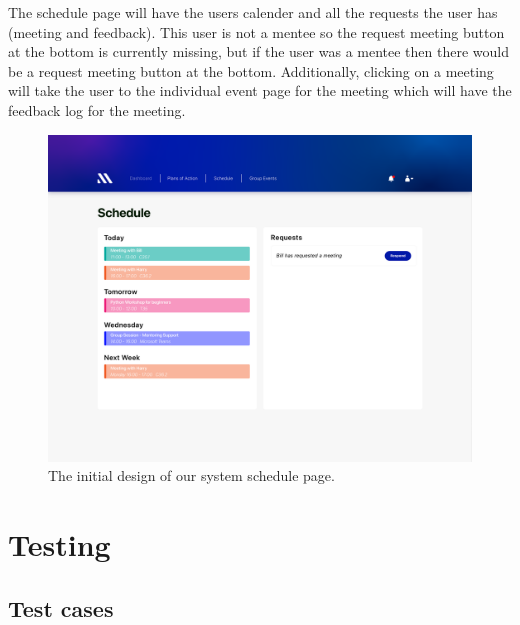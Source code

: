 \documentclass[10pt]{article}
\begin{document}
The schedule page will have the users calender and all the requests the user has
(meeting and feedback). This user is not a mentee so the request meeting button
at the bottom is currently missing, but if the user was a mentee then there
would be a request meeting button at the bottom. Additionally, clicking on a
meeting will take the user to the individual event page for the meeting which
will have the feedback log for the meeting.

\begin{figure}[H]
    \centering
    \includegraphics[width=0.48 \textwidth]{Schedule}
    \caption{The initial design of our system schedule page.}
    \label{fig:schedule}
\end{figure}


\section{Testing}
\subsection{Test cases}
\end{document}
